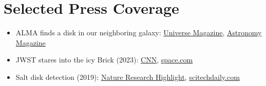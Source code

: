 
\setlength{\extrarowheight}{7pt}

\section*{Selected Press Coverage}

\begin{itemize}
    \item ALMA finds a disk in our neighboring galaxy: 
            \href{https://universemagazine.com/en/alma-discovers-a-protoplanetary-disk-outside-the-milky-way-for-the-first-time/}{Universe Magazine},
            \href{https://www.astronomy.com/science/astronomers-discover-disk-around-star-in-another-galaxy-for-the-1st-time-ever/}{Astronomy Magazine}
    \item JWST stares into the icy Brick (2023):
            \href{https://www.cnn.com/2023/12/07/world/the-brick-milky-way-webb-telescope-scn/index.html}{CNN},
            \href{https://www.space.com/james-webb-space-telescope-investigates-the-brick-dark-nebula}{space.com}
    \item Salt disk detection (2019):
            \href{https://www.nature.com/articles/d41586-019-00569-0}{Nature Research Highlight},
            \href{https://scitechdaily.com/alma-discovers-ordinary-table-salt-in-disk-surrounding-massive-star/}{scitechdaily.com}
\end{itemize}
